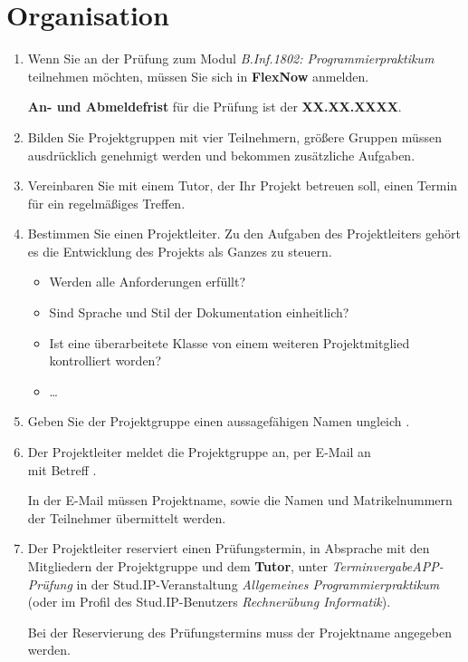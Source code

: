 \section*{Organisation}
\begin{enumerate}
\item Wenn Sie an der Prüfung zum Modul \emph{B.Inf.1802: Programmierpraktikum} teilnehmen möchten, müssen Sie sich in \textbf{FlexNow} anmelden.

\textbf{An- und Abmeldefrist} für die Prüfung ist der \textbf{XX.XX.XXXX}.
\item Bilden Sie Projektgruppen mit vier Teilnehmern, größere Gruppen müssen ausdrücklich genehmigt werden und bekommen zusätzliche Aufgaben.
\item Vereinbaren Sie mit einem Tutor, der Ihr Projekt betreuen soll, einen Termin für ein regelmäßiges Treffen.
\item Bestimmen Sie einen Projektleiter. Zu den Aufgaben des Projektleiters gehört es die Entwicklung des Projekts als Ganzes zu steuern.
\begin{itemize}
\item Werden alle Anforderungen erfüllt?
\item Sind Sprache und Stil der Dokumentation einheitlich?
\item Ist eine überarbeitete Klasse von einem weiteren Projektmitglied kontrolliert worden?
\item \dots
\end{itemize}
\item Geben Sie der Projektgruppe einen aussagefähigen Namen ungleich .
\item Der Projektleiter meldet die Projektgruppe an, per E-Mail an \\\href{mailto:brosenne@informatik.uni-goettingen.de}{} mit Betreff .

In der E-Mail müssen Projektname, sowie die Namen und Matrikelnummern der Teilnehmer übermittelt werden.
\item Der Projektleiter reserviert einen Prüfungstermin, in Absprache mit den Mitgliedern der Projektgruppe und dem \textbf{Tutor}, unter \textit{Terminvergabe\textrightarrow APP-Prüfung} in der Stud.IP-Veranstaltung \textit{Allgemeines Programmierpraktikum} (oder im Profil des Stud.IP-Benutzers \textit{Rechnerübung Informatik}).

Bei der Reservierung des Prüfungstermins muss der Projektname angegeben werden.
\end{enumerate}